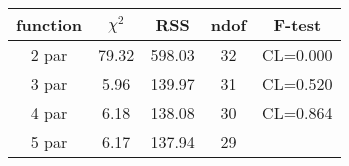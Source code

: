 \begin{tabular}{c|c|c|c|c}
function & $\chi^2$ & RSS & ndof & F-test \\
\hline
2 par & 79.32 & 598.03 & 32 & CL=0.000 \\
3 par & 5.96 & 139.97 & 31 & CL=0.520 \\
4 par & 6.18 & 138.08 & 30 & CL=0.864 \\
5 par & 6.17 & 137.94 & 29 & \\
\hline
\end{tabular}